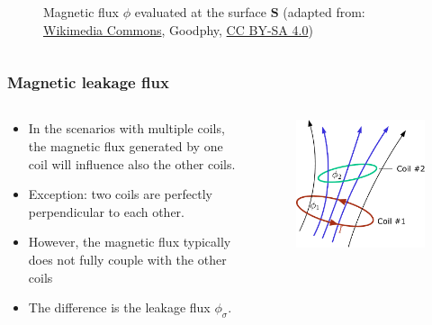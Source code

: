 \begin{frame}
\begin{columns}
\begin{column}{0.425\textwidth}
\begin{figure}
				\caption{Magnetic flux $\phi$ evaluated at the surface $\bm{S}$  (adapted from: \href{https://commons.wikimedia.org/wiki/File:Solenoid_and_Ampere_Law.png}{Wikimedia Commons}, Goodphy, \href{https://creativecommons.org/licenses/by-sa/4.0/deed.en}{CC BY-SA 4.0})}
                \label{fig:Solenoid_Flux}
			\end{figure}
		\end{column}
		\end{columns}
\end{frame}

\begin{frame}
	\frametitle{Magnetic leakage flux}
	\begin{columns}
		\begin{column}{0.48\textwidth}
			\begin{itemize}
                \item In the scenarios with multiple coils, the magnetic flux generated by one coil will influence also the other coils.
                \item Exception: two coils are perfectly perpendicular to each other.
                \item However, the magnetic flux typically does not fully couple with the other coils
                \item The difference is the leakage flux $\phi_\sigma$.
            \end{itemize}
		\end{column}
        \hfill
		\begin{column}{0.48\textwidth}
            \vspace{-0.2cm}
			\begin{figure}
				\centering
				\includegraphics[height=0.55\textheight]{fig/lec02/Leakage_flux.pdf}

\end{figure}
\end{column}
\end{columns}
\end{frame}
